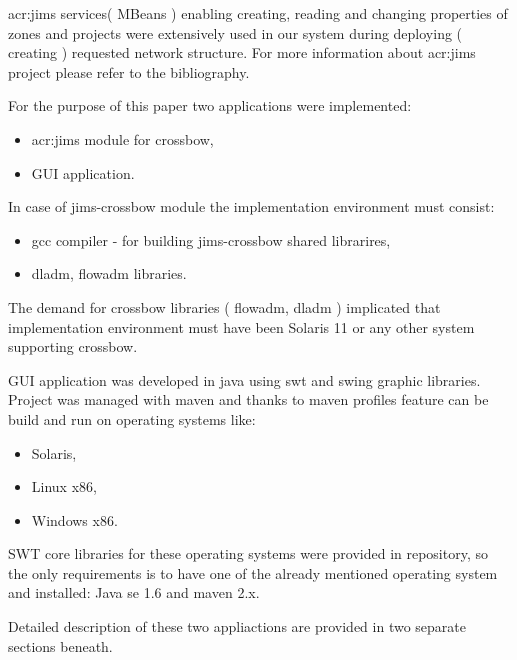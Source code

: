 \documentclass[11pt]{book}
\begin{document}
      \gls{acr:jims} services( MBeans ) enabling creating, reading and changing properties of zones and projects were extensively
      used in our system during deploying ( creating ) requested network structure. For more information about \gls{acr:jims}
      project please refer to the bibliography.	
    
      \medskip
	
      For the purpose of this paper two applications were implemented:
	
      \begin{itemize}
        \item \gls{acr:jims} module for crossbow,
        \item GUI application.
      \end{itemize}
	  
	  \medskip
	
      In case of jims-crossbow module the implementation environment must consist:

      \begin{itemize}
        \item gcc compiler - for building jims-crossbow shared librarires,
        \item dladm, flowadm libraries.
      \end{itemize}
	
      The demand for crossbow libraries ( flowadm, dladm ) implicated that implementation environment must have been
      Solaris 11 or any other system supporting crossbow.
    
      GUI application was developed in java using swt and swing graphic libraries. Project was managed with maven and
      thanks to maven profiles feature can be build and run on operating systems like:

      \begin{itemize}
        \item Solaris,
        \item Linux x86,
        \item Windows x86.
      \end{itemize}

      SWT core libraries for these operating systems were provided in repository, so the only requirements is to have
      one of the already mentioned operating system and installed: Java se 1.6 and maven 2.x.
	  
	  \medskip
	  
	  Detailed description of these two appliactions are provided in two separate sections beneath. 
	  
\end{document}
